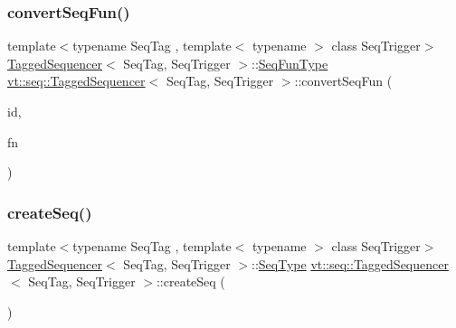 \subsubsection{\texorpdfstring{convert\+Seq\+Fun()}{convertSeqFun()}}
{\footnotesize\ttfamily template$<$typename Seq\+Tag , template$<$ typename $>$ class Seq\+Trigger$>$ \\
\hyperlink{structvt_1_1seq_1_1_tagged_sequencer}{Tagged\+Sequencer}$<$ Seq\+Tag, Seq\+Trigger $>$\+::\hyperlink{structvt_1_1seq_1_1_tagged_sequencer_a87fb29cbd9fa0823f2b4fad1ac111993}{Seq\+Fun\+Type} \hyperlink{structvt_1_1seq_1_1_tagged_sequencer}{vt\+::seq\+::\+Tagged\+Sequencer}$<$ Seq\+Tag, Seq\+Trigger $>$\+::convert\+Seq\+Fun (\begin{DoxyParamCaption}\item[{\hyperlink{structvt_1_1seq_1_1_tagged_sequencer_a1c8ee839258d0f88c49ef660267a81d5}{Seq\+Type} const \&}]{id,  }\item[{\hyperlink{namespacevt_1_1seq_aeb4674d25dcb5d27248b68ec83fad2b6}{User\+Seq\+Fun\+Type}}]{fn }\end{DoxyParamCaption})\hspace{0.3cm}{\ttfamily [static]}}

\mbox{\label{structvt_1_1seq_1_1_tagged_sequencer_a40e2409864dd545725218f4a8784fa94}} 
\subsubsection{\texorpdfstring{create\+Seq()}{createSeq()}}
{\footnotesize\ttfamily template$<$typename Seq\+Tag , template$<$ typename $>$ class Seq\+Trigger$>$ \\
\hyperlink{structvt_1_1seq_1_1_tagged_sequencer}{Tagged\+Sequencer}$<$ Seq\+Tag, Seq\+Trigger $>$\+::\hyperlink{structvt_1_1seq_1_1_tagged_sequencer_a1c8ee839258d0f88c49ef660267a81d5}{Seq\+Type} \hyperlink{structvt_1_1seq_1_1_tagged_sequencer}{vt\+::seq\+::\+Tagged\+Sequencer}$<$ Seq\+Tag, Seq\+Trigger $>$\+::create\+Seq (\begin{DoxyParamCaption}{ }\end{DoxyParamCaption})}

\mbox{\label{structvt_1_1seq_1_1_tagged_sequencer_a630c6ca99c2741c5156b4911c611913b}} 
